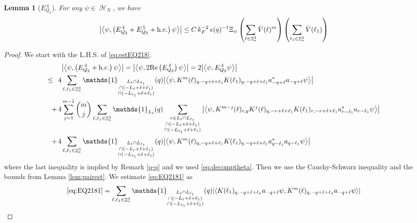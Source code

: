 \documentclass[sn-mathphys, Numbered ,a4paper]{sn-jnl}%
\DeclareMathOperator{\Z}{\mathbb{Z}}
\DeclareMathOperator{\HH}{\mathcal{H}}
\newcommand{\eva}[1]{\left\langle #1 \right\rangle}
\theoremstyle{plain}
\newtheorem{lemma}[theorem]{Lemma}
\theoremstyle{definition}
\theoremstyle{remark}
\theoremstyle{plain}
\theoremstyle{definition}
\theoremstyle{remark}
\begin{document}
\begin{lemma}[$E_{Q_2}^{\,4}$]\label{lem:EQ218}
	For any $\psi \in \HH_N$, we have
	\begin{alignat}{2}
		\abs{\eva{\psi,\left(E^{\,4}_{Q_2}+E^{\,5}_{Q_2}+\mathrm{h.c.}\right) \psi }}
		\leq  C\, k_{F}^{-2}\, e(q)^{-1} \Xi_{\psi} \left(\sum\limits_{\ell \in \Z^3_*} \hat{V}(\ell)^m \right) \left(\sum\limits_{\ell_1 \in \Z^3_*} \hat{V}(\ell_1) \right) \label{eq:estEQ218}  
	\end{alignat}
\end{lemma}
\begin{proof}
	We start with the L.H.S. of \eqref{eq:estEQ218}.
	\begin{align}
		&\abs{\eva{\psi,\left(E^{\,4}_{Q_2}+\mathrm{h.c.}\right) \psi }} = \abs{\eva{\psi,2\mathrm{Re}\left(E^{\,4}_{Q_2}\right) \psi }} = 2\abs{\eva{\psi, E^{\,4}_{Q_2} \psi }}\nonumber\\
		\leq\,\;4& \sum\limits_{\ell, \ell_1\in \Z^3_*} \mathds{1}_{\substack{L_{\ell}\cap L_{\ell_1}\\\cap (-L_{\ell}+\ell+\ell_1) \\ \cap (-L_{\ell_1}+\ell+\ell_1)}}(q) \abs{\eva{\psi, K^m(\ell)_{q,-q+\ell+\ell_1} K(\ell_1)_{q,-q+\ell+\ell_1} a^*_{-q+\ell}a_{-q+\ell} \psi }} \label{eq:EQ2181}\\
		+\,4& \sum\limits_{j=1}^{m-1} {{m}\choose j} \sum\limits_{\ell, \ell_1\in \Z^3_*}\mathds{1}_{L_{\ell}}(q) \sum\limits_{\substack{r\in L_{\ell} \cap L_{\ell_1}\\\cap (-L_{\ell}+\ell+\ell_1) \\ \cap (-L_{\ell_1}+\ell+\ell_1)}}  \abs{\eva{\psi, K^{m-j}(\ell)_{r,q} K^j(\ell)_{q,-r+\ell+\ell_1} K(\ell_1)_{r,-r+\ell+\ell_1} a^*_{r-\ell_1}a_{r-\ell_1} \psi }} \label{eq:EQ2182}\\
		+\,4&\sum\limits_{\ell, \ell_1\in \Z^3_*} \mathds{1}_{\substack{L_{\ell}\cap L_{\ell_1}\\\cap (-L_{\ell}+\ell+\ell_1) \\ \cap (-L_{\ell_1}+\ell+\ell_1)}} (q) \abs{\eva{\psi, K^m(\ell)_{q,-q+\ell+\ell_1}K(\ell_1)_{q,-q+\ell+\ell_1} a^*_{q-\ell_1}a_{q-\ell_1}\psi }} \label{eq:EQ2183}
	\end{align}
	where the last inequality is implied by Remark \ref{q-q} and we used \eqref{eq:decomptheta}. Then we use the Cauchy-Schwarz inequality and the bounds from Lemma \ref{lem:pairest}.
	We estimate \eqref{eq:EQ2181} as 
	\begin{align}
		\eqref{eq:EQ2181}
		&= \sum\limits_{\ell, \ell_1\in \Z^3_*} \mathds{1}_{\substack{L_{\ell}\cap L_{\ell_1}\\\cap (-L_{\ell}+\ell+\ell_1) \\ \cap (-L_{\ell_1}+\ell+\ell_1)}}(q) \abs{\eva{ K(\ell_1)_{q,-q+\ell+\ell_1} a_{-q+\ell} \psi, K^m(\ell)_{q,-q+\ell+\ell_1} a_{-q+\ell} \psi }}\nonumber\\

\end{align}
\end{proof}
\end{document}
